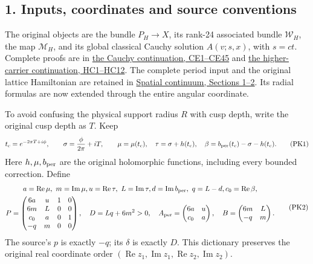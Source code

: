\documentclass[11pt]{article}
\begin{document}
\subsection*{1. Inputs, coordinates and source conventions}

The original objects are the bundle \(P_H\to X\), its rank-24 associated
bundle \(\mathcal W_H\), the map \(\mathcal M_H\), and its global
classical Cauchy solution \(A(v;s,x)\), with \(s=ct\). Complete proofs are
in \href{https://github.com/KokunoYumeto/yang-mills-interacting-workbench/blob/7d5681ed53835433a5fb72d880b6292832f2efbf/yang-mills/continuations/20260930-s6-ns-moment-map-bridge/COMPACT_SUPPORT_CAUCHY_EVOLUTION.md}{the Cauchy continuation, CE1–CE45}
and \href{https://github.com/KokunoYumeto/yang-mills-interacting-workbench/blob/7d5681ed53835433a5fb72d880b6292832f2efbf/yang-mills/continuations/20260930-s6-ns-moment-map-bridge/HIGHER_CARRIER_AND_EVOLUTION.md}{the higher-carrier continuation, HC1–HC12}.
The complete period input and the original lattice Hamiltonian are retained
in \href{https://github.com/KokunoYumeto/yang-mills-interacting-workbench/blob/7d5681ed53835433a5fb72d880b6292832f2efbf/yang-mills/continuations/20260930-s6-ns-moment-map-bridge/sources/spatial/spatial_continuum.tex#L113}{Spatial continuum, Sections 1–2}.
Its radial formulas are now extended through the entire angular coordinate.

To avoid confusing the physical support radius \(R\) with cusp depth,
write the original cusp depth as \(T\). Keep
\[
 t_c=e^{-2\pi T+i\phi},\qquad
 \sigma=\frac{\phi}{2\pi}+iT,\qquad
 \mu=\mu(t_c),\quad \tau=\sigma+h(t_c),\quad
 \beta=b_{\rm per}(t_c)-\sigma-h(t_c).
 \tag{PK1}
\]
Here \(h,\mu,b_{\rm per}\) are the original holomorphic functions,
including every bounded correction. Define
\[
 \begin{gathered}
 a=\operatorname{Re}\mu,\ m=\operatorname{Im}\mu,
 u=\operatorname{Re}\tau,\ L=\operatorname{Im}\tau,
 d=\operatorname{Im}b_{\rm per},\ q=L-d,
 c_0=\operatorname{Re}\beta,\\
 P=\begin{pmatrix}6a&u&1&0\\6m&L&0&0\\c_0&a&0&1\\-q&m&0&0\end{pmatrix},
 \quad D=Lq+6m^2>0,
 \quad A_{\rm per}=\begin{pmatrix}6a&u\\c_0&a\end{pmatrix},
 \quad B=\begin{pmatrix}6m&L\\-q&m\end{pmatrix}.
 \end{gathered}\tag{PK2}
\]
The source's \(p\) is exactly \(-q\); its \(\delta\) is exactly \(D\).
This dictionary preserves the original real coordinate order
\((\operatorname{Re}z_1,\operatorname{Im}z_1,
\operatorname{Re}z_2,\operatorname{Im}z_2)\).
\end{document}
